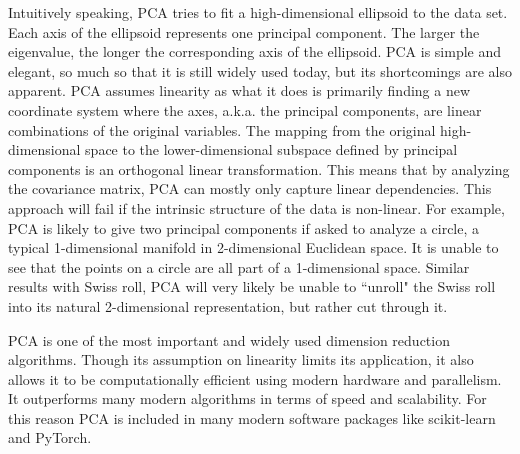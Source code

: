 Intuitively speaking, PCA tries to fit a high-dimensional ellipsoid to the data
set. Each axis of the ellipsoid represents one principal component. The larger
the eigenvalue, the longer the corresponding axis of the ellipsoid. PCA is
simple and elegant, so much so that it is still widely used today, but its
shortcomings are also apparent. PCA assumes linearity as what it does is
primarily finding a new coordinate system where the axes, a.k.a. the principal
components, are linear combinations of the original variables. The mapping from
the original high-dimensional space to the lower-dimensional subspace defined
by principal components is an orthogonal linear transformation. This means that
by analyzing the covariance matrix, PCA can mostly only capture linear
dependencies. This approach will fail if the intrinsic structure of the data is
non-linear. For example, PCA is likely to give two principal components if
asked to analyze a circle, a typical 1-dimensional manifold in 2-dimensional
Euclidean space. It is unable to see that the points on a circle are all part
of a 1-dimensional space. Similar results with Swiss roll, PCA will very likely
be unable to ``unroll" the Swiss roll into its natural 2-dimensional
representation, but rather cut through it.

PCA is one of the most important and widely used dimension reduction
algorithms. Though its assumption on linearity limits its application, it also
allows it to be computationally efficient using modern hardware and
parallelism. It outperforms many modern algorithms in terms of speed and
scalability. For this reason PCA is included in many modern software packages
like scikit-learn and PyTorch.

